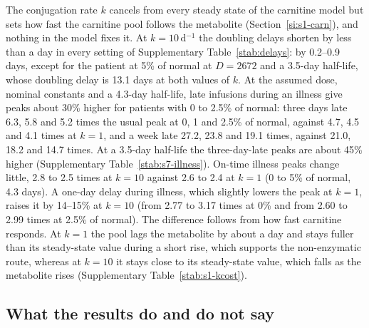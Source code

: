 The conjugation rate $k$ cancels from every steady state of the carnitine model but sets how fast the
carnitine pool follows the metabolite (Section~\ref{si:s1-carn}), and nothing in the model fixes it.
At $k=10$\,d$^{-1}$ the doubling delays shorten by less than a day in every setting of Supplementary
Table~\ref{stab:delays}: by 0.2--0.9 days, except for the patient at 5\% of normal at $D=2672$ and a
3.5-day half-life, whose doubling delay is 13.1 days at both values of $k$. At the assumed dose,
nominal constants and a 4.3-day half-life, late infusions during an illness give peaks about 30\%
higher for patients with 0 to 2.5\% of normal: three days late 6.3, 5.8 and 5.2 times the usual peak
at 0, 1 and 2.5\% of normal, against 4.7, 4.5 and 4.1 times at $k=1$, and a week late 27.2, 23.8 and
19.1 times, against 21.0, 18.2 and 14.7 times. At a 3.5-day half-life the three-day-late peaks are
about 45\% higher (Supplementary Table~\ref{stab:s7-illness}). On-time illness peaks change little,
2.8 to 2.5 times at $k=10$ against 2.6 to 2.4 at $k=1$ (0 to 5\% of normal, 4.3 days). A one-day
delay during illness, which slightly lowers the peak at $k=1$, raises it by 14--15\% at $k=10$ (from
2.77 to 3.17 times at 0\% and from 2.60 to 2.99 times at 2.5\% of normal). The difference follows
from how fast carnitine responds. At $k=1$ the pool lags the metabolite by about a day and stays
fuller than its steady-state value during a short rise, which supports the non-enzymatic route,
whereas at $k=10$ it stays close to its steady-state value, which falls as the metabolite rises
(Supplementary Table~\ref{stab:s1-kcost}).

\subsection{What the results do and do not say}
\label{si:s7:reading}

